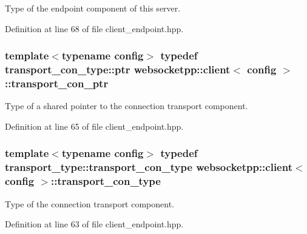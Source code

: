 Type of the endpoint component of this server. 



Definition at line 68 of file client\+\_\+endpoint.\+hpp.

\hypertarget{classwebsocketpp_1_1client_a6087b4e73f1864c893e16b33017b2da6}{}
\subsubsection[{transport\+\_\+con\+\_\+ptr}]{\setlength{\rightskip}{0pt plus 5cm}template$<$typename config$>$ typedef transport\+\_\+con\+\_\+type\+::ptr {\bf websocketpp\+::client}$<$ config $>$\+::{\bf transport\+\_\+con\+\_\+ptr}}\label{classwebsocketpp_1_1client_a6087b4e73f1864c893e16b33017b2da6}


Type of a shared pointer to the connection transport component. 



Definition at line 65 of file client\+\_\+endpoint.\+hpp.

\hypertarget{classwebsocketpp_1_1client_af990a5c874d701129894f5cc88b69507}{}
\subsubsection[{transport\+\_\+con\+\_\+type}]{\setlength{\rightskip}{0pt plus 5cm}template$<$typename config$>$ typedef transport\+\_\+type\+::transport\+\_\+con\+\_\+type {\bf websocketpp\+::client}$<$ config $>$\+::{\bf transport\+\_\+con\+\_\+type}}\label{classwebsocketpp_1_1client_af990a5c874d701129894f5cc88b69507}


Type of the connection transport component. 



Definition at line 63 of file client\+\_\+endpoint.\+hpp.

\hypertarget{classwebsocketpp_1_1client_a042957cf1c89e7a4c39cf1ec26046e2d}{}
